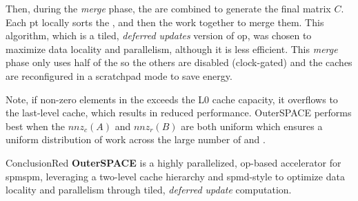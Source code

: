 Then, during the \textit{merge} phase, the  are combined to generate the final matrix $C$.
Each \acrshort{pt} locally sorts the , and then the  work together to merge them.
This algorithm, which is a tiled, \textit{deferred updates} version of \acrshort{op}, was chosen to maximize data locality and parallelism, although it is less efficient.
This \textit{merge} phase only uses half of the  so the others are disabled (clock-gated) and the caches are reconfigured in a scratchpad mode to save energy.

Note, if non-zero elements in the  exceeds the L0 cache capacity, it overflows to the last-level cache, which results in reduced performance.
OuterSPACE performs best when the $\mathit{nnz}_c(A)$ and $\mathit{nnz}_r(B)$ are both uniform which ensures a uniform distribution of work across the large number of  and .

\begin{highlight}{Conclusion}{Red}
    \textbf{OuterSPACE} is a highly parallelized, \acrshort{op}-based accelerator for \acrshort{spmspm}, leveraging a two-level cache hierarchy and \acrshort{spmd}-style  to optimize data locality and parallelism through tiled, \textit{deferred update} computation.
\end{highlight}